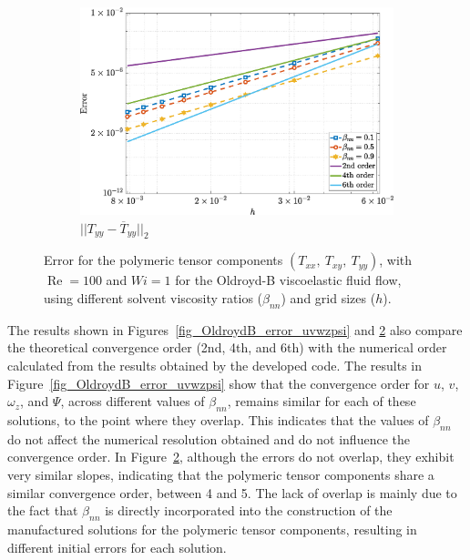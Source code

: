 \documentclass[preprint, 12pt]{elsarticle}
\begin{document}
\begin{figure}[H]
\begin{subfigure}[b]{.46\textwidth}
        \includegraphics[width=\textwidth]{NormErr_2nd_Re_100_Wi_1_epsilon_0_xi_0_alphaG_0_Dt_1e-06_at_0.05_tipsim_1_MMS_12_Tyy.eps}
        \caption{$||T_{yy} - \overline{T}_{yy}||_{2}$}
        \label{error_tyy_2nd_Case1_oldorydb}
    \end{subfigure}
    \vspace{0.02cm}
    \caption{Error for the polymeric tensor components $({T}_{xx},~{T}_{xy},~{T}_{yy})$, with $\operatorname{Re}=100$ and $Wi=1$ for the Oldroyd-B viscoelastic fluid flow, using different solvent viscosity ratios ($\beta_{nn}$) and grid sizes ($h$).\label{fig_OldroydB_error_txxxyyy}}
\end{figure}

The results shown in Figures~\ref{fig_OldroydB_error_uvwzpsi} and \ref{fig_OldroydB_error_txxxyyy}  also compare the theoretical convergence order (2nd, 4th, and 6th) with the numerical order calculated from the results obtained by the developed code. The results in Figure~\ref{fig_OldroydB_error_uvwzpsi} show that the convergence order for $u$, $v$, $\omega_{z}$, and $\Psi$, across different values of $\beta_{nn}$, remains similar for each of these solutions, to the point where they overlap. This indicates that the values of $\beta_{nn}$ do not affect the numerical resolution obtained and do not influence the convergence order. In Figure~\ref{fig_OldroydB_error_txxxyyy}, although the errors do not overlap, they exhibit very similar slopes, indicating that the polymeric tensor components share a similar convergence order, between 4 and 5. The lack of overlap is mainly due to the fact that $\beta_{nn}$ is directly incorporated into the construction of the manufactured solutions for the polymeric tensor components, resulting in different initial errors for each solution.
\end{document}
